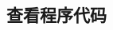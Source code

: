 \documentclass[class=book, crop=false]{standalone}
\begin{document}
\begin{CJK}{UTF8}{gbsn}

\chapter{查看程序代码}















\cleardoublepage

\end{CJK}
\end{document}
